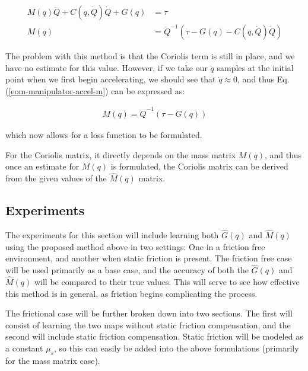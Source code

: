 \begin{align}
  \label{eom-manipulator-accel}
  M(q)\ddot{Q} + C(q,\dot{Q})\dot{Q} + G(q) &= \tau\\
  \label{eom-manipulator-accel-m}
  M(q) &= \ddot{Q}^{-1}(\tau - G(q) - C(q,\dot{Q})\dot{Q})
\end{align}

The problem with this method is that the Coriolis term is still in place, and we
have no estimate for this value.
However, if we take our $\ddot{q}$ samples at the initial point when we first
begin accelerating, we should see that $\dot{q} \approx 0$, and thus Eq.
(\ref{eom-manipulator-accel-m}) can be expressed as:

\begin{align}
  M(q) = \ddot{Q}^{-1}(\tau - G(q))
\end{align}

\noindent which now allows for a loss function to be formulated.

For the Coriolis matrix, it directly depends on the mass matrix $M(q)$, and thus
once an estimate for $M(q)$ is formulated, the Coriolis matrix can be derived
from the given values of the $\hat{M}(q)$ matrix.

\subsection{Experiments}
The experiments for this section will include learning both $\hat{G}(q)$ and
$\hat{M}(q)$ using the proposed method above in two settings: One in a friction
free environment, and another when static friction is present.
The friction free case will be used primarily as a base case, and the accuracy
of both the $\hat{G}(q)$ and $\hat{M}(q)$ will be compared to their true values.
This will serve to see how effective this method is in general, as
friction begins complicating the process.

The frictional case will be further broken down into two sections.
The first will consist of learning the two maps without static friction
compensation, and the second will include static friction compensation.
Static friction will be modeled as a constant $\mu_{s}$, so this can easily be
added into the above formulations (primarily for the mass matrix case).
